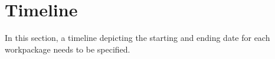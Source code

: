 \chapter{Timeline}
In this section, a timeline depicting the starting and ending date for each workpackage needs to be specified.




